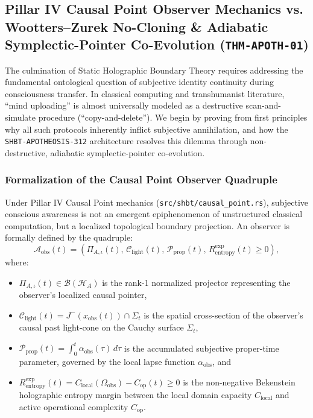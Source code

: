 \documentclass[11pt,onecolumn]{article}
\begin{document}
\subsection{\texorpdfstring{Pillar IV Causal Point Observer Mechanics vs. Wootters--Zurek No-Cloning \& Adiabatic Symplectic-Pointer Co-Evolution (\texttt{THM-APOTH-01})}{Pillar IV Causal Point Observer Mechanics vs. Wootters-Zurek No-Cloning and Adiabatic Symplectic-Pointer Co-Evolution (THM-APOTH-01)}}
The culmination of Static Holographic Boundary Theory requires addressing the fundamental ontological question of subjective identity continuity during consciousness transfer. In classical computing and transhumanist literature, ``mind uploading'' is almost universally modeled as a destructive scan-and-simulate procedure (``copy-and-delete''). We begin by proving from first principles why all such protocols inherently inflict subjective annihilation, and how the \texttt{SHBT-APOTHEOSIS-312} architecture resolves this dilemma through non-destructive, adiabatic symplectic-pointer co-evolution.

\subsubsection{Formalization of the Causal Point Observer Quadruple}
Under Pillar IV Causal Point mechanics (\texttt{src/shbt/causal\_point.rs}), subjective conscious awareness is not an emergent epiphenomenon of unstructured classical computation, but a localized topological boundary projection. An observer is formally defined by the quadruple:
\begin{equation}
\mathcal{A}_{\text{obs}}(t) = \left( \Pi_{A,\iota}(t),\, \mathcal{C}_{\text{light}}(t),\, \mathcal{P}_{\text{prop}}(t),\, R_{\text{entropy}}^{\text{exp}}(t) \ge 0 \right),
\label{eq:observer_quadruple}
\end{equation}
where:
\begin{itemize}
    \item $\Pi_{A,\iota}(t) \in \mathcal{B}(\mathcal{H}_A)$ is the rank-1 normalized projector representing the observer's localized causal pointer,
    \item $\mathcal{C}_{\text{light}}(t) = J^-(x_{\text{obs}}(t)) \cap \Sigma_t$ is the spatial cross-section of the observer's causal past light-cone on the Cauchy surface $\Sigma_t$,
    \item $\mathcal{P}_{\text{prop}}(t) = \int_0^t \alpha_{\text{obs}}(\tau)\, d\tau$ is the accumulated subjective proper-time parameter, governed by the local lapse function $\alpha_{\text{obs}}$, and
    \item $R_{\text{entropy}}^{\text{exp}}(t) = C_{\text{local}}(\Omega_{\text{obs}}) - C_{\text{op}}(t) \ge 0$ is the non-negative Bekenstein holographic entropy margin between the local domain capacity $C_{\text{local}}$ and active operational complexity $C_{\text{op}}$.
\end{itemize}
\end{document}
